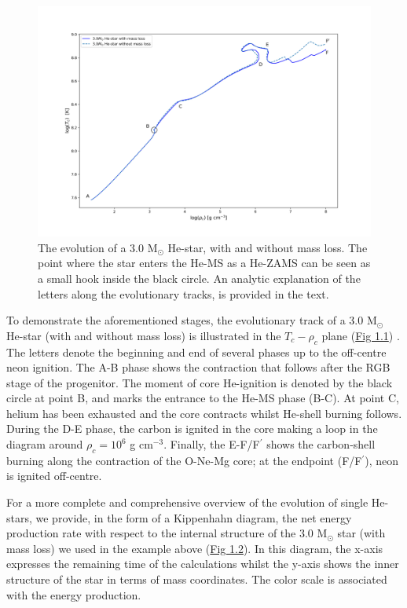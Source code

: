 \documentclass[../../main/thesis_msc.tex]{subfiles}
\begin{document}
				\begin{figure}[t]
					\centering
					\includegraphics[scale=0.5]{../figures/chapter1/T_rho_plane_ch1.png}
					\caption{The evolution of a $3.0$ M$_{\odot}$ He-star, with and without mass loss. The point where the star enters the He-MS as a He-ZAMS can be seen as a small hook inside the black circle. An analytic explanation of the letters along the evolutionary tracks, is provided in the text.}
					\label{fig:T_rho_plane_ch1}
				\end{figure}
				
				To demonstrate the aforementioned stages, the evolutionary track of a $3.0$ M$_{\odot}$ He-star (with and without mass loss) is illustrated in the $T_c - \rho_c$ plane (\hyperref[fig:T_rho_plane_ch1]{Fig 1.1}) \citep[see also][]{Habets_a, Habets_b, Nomoto1987}. The letters denote the beginning and end of several phases up to the off-centre neon ignition. The A-B phase shows the contraction that follows after the RGB stage of the progenitor. The moment of core He-ignition is denoted by the black circle at point B, and marks the entrance to the He-MS phase (B-C). At point C, helium has been exhausted and the core contracts whilst He-shell burning follows. During the D-E phase, the carbon is ignited in the core making a loop in the diagram around $\rho_c = 10^6$ g cm$^{-3}$. Finally, the E-F/F$^\prime$ shows the carbon-shell burning along the contraction of the O-Ne-Mg core; at the endpoint (F/F$^\prime$), neon is ignited off-centre.
				
				For a more complete and comprehensive overview of the evolution of single He-stars, we provide, in the form of a Kippenhahn diagram, the net energy production rate with respect to the internal structure of the $3.0$ M$_{\odot}$ star (with mass loss) we used in the example above (\hyperref[fig:Kipp_3p0_ch1]{Fig 1.2}). In this diagram, the x-axis expresses the remaining time of the calculations whilst the y-axis shows the inner structure of the star in terms of mass coordinates. The color scale is associated with the energy production.
				
\end{document}

